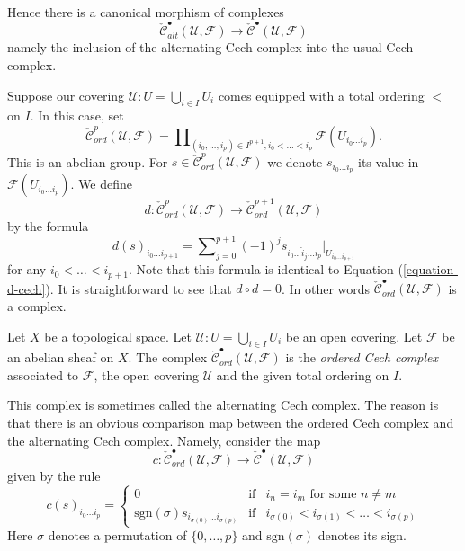 \noindent
Hence there is a canonical morphism of complexes
$$
\check{\mathcal{C}}_{alt}^\bullet(\mathcal{U}, \mathcal{F})
\longrightarrow
\check{\mathcal{C}}^\bullet(\mathcal{U}, \mathcal{F})
$$
namely the inclusion of the alternating Cech complex into the
usual Cech complex.

\medskip\noindent
Suppose our covering $\mathcal{U} : U = \bigcup_{i \in I} U_i$ comes
equipped with a total ordering $<$ on $I$. In this case, set
$$
\check{\mathcal{C}}_{ord}^p(\mathcal{U}, \mathcal{F})
=
\prod\nolimits_{(i_0, \ldots, i_p) \in I^{p + 1}, i_0 < \ldots < i_p}
\mathcal{F}(U_{i_0\ldots i_p}).
$$
This is an abelian group. For
$s \in \check{\mathcal{C}}_{ord}^p(\mathcal{U}, \mathcal{F})$ we denote
$s_{i_0\ldots i_p}$ its value in $\mathcal{F}(U_{i_0\ldots i_p})$.
We define
$$
d : \check{\mathcal{C}}_{ord}^p(\mathcal{U}, \mathcal{F})
\longrightarrow
\check{\mathcal{C}}_{ord}^{p + 1}(\mathcal{U}, \mathcal{F})
$$
by the formula
$$
d(s)_{i_0\ldots i_{p + 1}}
=
\sum\nolimits_{j = 0}^{p + 1}
(-1)^j
s_{i_0\ldots \hat i_j \ldots i_p}|_{U_{i_0\ldots i_{p + 1}}}
$$
for any $i_0 < \ldots < i_{p + 1}$. Note that this formula is identical
to Equation (\ref{equation-d-cech}).
It is straightforward to see that $d \circ d = 0$. In other words
$\check{\mathcal{C}}_{ord}^\bullet(\mathcal{U}, \mathcal{F})$ is a complex.

\begin{definition}
\label{definition-ordered-cech-complex}
Let $X$ be a topological space.
Let $\mathcal{U} : U = \bigcup_{i \in I} U_i$ be an open covering.
Let $\mathcal{F}$ be an abelian sheaf on $X$.
The complex $\check{\mathcal{C}}_{ord}^\bullet(\mathcal{U}, \mathcal{F})$
is the {\it ordered Cech complex} associated to $\mathcal{F}$, the
open covering $\mathcal{U}$ and the given total ordering on $I$.
\end{definition}

\noindent
This complex is sometimes called the alternating Cech complex.
The reason is that there is an obvious comparison map between
the ordered Cech complex and the alternating Cech complex.
Namely, consider the map
$$
c :
\check{\mathcal{C}}_{ord}^\bullet(\mathcal{U}, \mathcal{F})
\longrightarrow
\check{\mathcal{C}}^\bullet(\mathcal{U}, \mathcal{F})
$$
given by the rule
$$
c(s)_{i_0\ldots i_p} = 
\left\{
\begin{matrix}
0 &
\text{if} &
i_n = i_m \text{ for some } n \not = m\\
\text{sgn}(\sigma) s_{i_{\sigma(0)}\ldots i_{\sigma(p)}} &
\text{if} &
i_{\sigma(0)} < i_{\sigma(1)} < \ldots < i_{\sigma(p)}
\end{matrix}
\right.
$$
Here $\sigma$ denotes a permutation of $\{0, \ldots, p\}$ and
$\text{sgn}(\sigma)$ denotes its sign.

